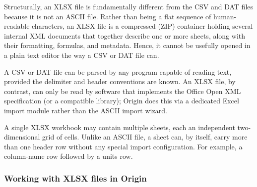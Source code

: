 			Structurally, an XLSX file is fundamentally different from the CSV and DAT files because it is not an ASCII file. Rather than being a flat sequence of human-readable characters, an XLSX file is a compressed (ZIP) container holding several internal XML documents that together describe one or more sheets, along with their formatting, formulas, and metadata. Hence, it cannot be usefully opened in a plain text editor the way a CSV or DAT file can.
			
			A CSV or DAT file can be parsed by any program capable of reading text, provided the delimiter and header conventions are known. An XLSX file, by contrast, can only be read by software that implements the Office Open XML specification (or a compatible library); Origin does this via a dedicated Excel import module rather than the ASCII import wizard.
			
			A single XLSX workbook may contain multiple sheets, each an independent two-dimensional grid of cells. Unlike an ASCII file, a sheet can, by itself, carry more than one header row without any special import configuration. For example, a column-name row followed by a units row.
			
		\newpage
		\subsubsection{Working with XLSX files in Origin}
		
